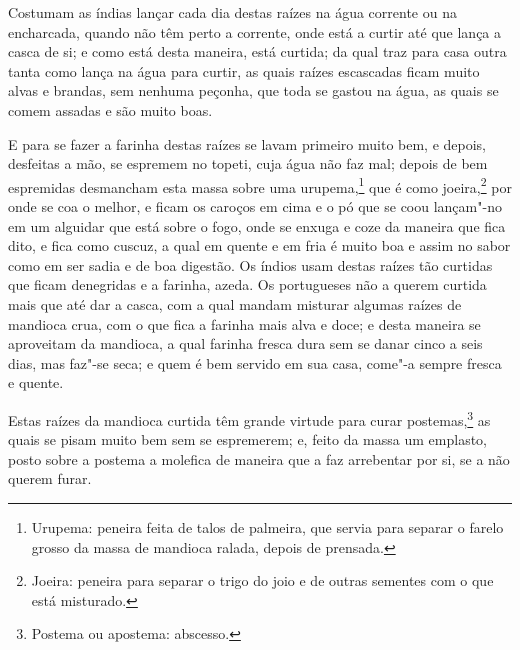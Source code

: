 \begin{linenumbers}
Costumam as índias lançar cada dia destas raízes na água corrente ou na encharcada, quando
não têm perto a corrente, onde está a curtir até que lança a casca de si; e como está
desta maneira, está curtida; da qual traz para casa outra tanta como lança na água para
curtir, as quais raízes escascadas ficam muito alvas e brandas, sem nenhuma peçonha, que
toda se gastou na água, as quais se comem assadas e são muito boas.

E para se fazer a farinha destas raízes se lavam primeiro muito bem, e depois, desfeitas a
mão, se espremem no topeti, cuja água não faz mal; depois de
bem espremidas desmancham esta massa sobre uma urupema,\footnote{ Urupema: peneira feita
de talos de palmeira, que servia para separar o farelo grosso da massa de mandioca ralada,
depois de prensada.} que é como joeira,\footnote{ Joeira: peneira para separar o trigo do
joio e de outras sementes com o que está misturado.} por onde se coa o melhor, e ficam os
caroços em cima e o pó que se coou lançam"-no em um alguidar que está sobre o fogo, onde se
enxuga e coze da maneira que fica dito, e fica como cuscuz, a qual em quente e em fria é
muito boa e assim no sabor como em ser sadia e de boa digestão. Os índios usam destas
raízes tão curtidas que ficam denegridas e a farinha, azeda. Os portugueses não a querem
curtida mais que até dar a casca, com a qual mandam misturar algumas raízes de mandioca
crua, com o que fica a farinha mais alva e doce; e desta maneira se aproveitam da
mandioca, a qual farinha fresca dura sem se danar cinco a seis dias, mas faz"-se seca; e
quem é bem servido em sua casa, come"-a sempre fresca e quente.

Estas raízes da mandioca curtida têm grande virtude para curar postemas,\footnote{ Postema
ou apostema: abscesso.} as quais se pisam muito bem sem se espremerem; e, feito da massa
um emplasto, posto sobre a postema a molefica de maneira que a faz arrebentar por si, se a
não querem furar.


\end{linenumbers}
